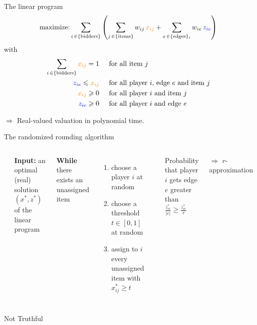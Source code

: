 \documentclass[aspectratio=169]{beamer}
\begin{document}
\begin{frame}{The linear program}
    \[
        \text{maximize:} \sum_{i \,\in \{\text{bidders}\}} \left(
        \sum_{j \,\in \{\text{items}\}} w_{ij}\, {\color{orange} x_{ij}}
        + \sum_{e \,\in \{\text{edges}\}_i} w_{ie}\, {\color{blue} z_{ie}}
        \right)
    \]
    with
    \begin{align*}
        \sum_{i \,\in \{\text{bidders}\}} {\color{orange} x_{ij}}  = 1 & \hspace{.5cm} \text{for all item \(j\)}                              \\
        {\color{blue} z_{ie}}  \leqslant {\color{orange} x_{ij}}       & \hspace{.5cm} \text{for all player \(i\), edge \(e\) and item \(j\)} \\
        {\color{orange} x_{ij}}   \geqslant 0                          & \hspace{.5cm} \text{for all player \(i\) and item \(j\)}             \\
        {\color{blue} z_{ie}}  \geqslant 0                             & \hspace{.5cm} \text{for all player \(i\) and edge \(e\)}
    \end{align*}

    $\Rightarrow$ Real-valued valuation in \alert{polynomial time}.
\end{frame}

\begin{frame}{The randomized rounding algorithm}
    \begin{columns}
        \hrule
        \vspace{.1cm}
        \textbf{Input:} an optimal (real) solution \((x^*, z^*)\) of the linear program

        \vspace{.65cm}
        \textbf{While} there exists an unassigned item
        \begin{enumerate}
            \item choose a player \(i\) at random
            \item choose a threshold \(t \in [0, 1]\) at random
            \item assign to \(i\) every unassigned item with \(x_{ij}^* \geqslant t\)
        \end{enumerate}
        \hrule

        Probability that player \(i\) gets edge \(e\) greater than \(\frac{z_{ie}^*}{|e|} \geqslant \frac{z_{ie}^*}{r}\)

        \(\Rightarrow\) \(r\)-approximation

    \end{columns}
    \pause
    \begin{center}
        \alert<2>{Not Truthful}
    \end{center}
\end{frame}
\end{document}
